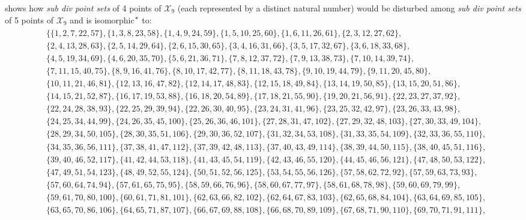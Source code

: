 \documentclass[11pt, oneside]{article}      %
\theoremstyle{definition}
\numberwithin{equation}{section}
\theoremstyle{c}
\begin{document}
shows how \textit{sub div point sets} of 4 points of $\mathscr{X_9}$ (each represented by a distinct natural number) would be disturbed among \textit{sub div point sets} of 5 points of $\mathscr{X_9}$ and is isomorphic$\color{black}^*$ to:
{\tiny
\begin{align*}\begin{split} 
&\{\{1,2,7,22,57\},\{1,3,8,23,58\},\{1,4,9,24,59\},\{1,5,10,25,60\},\{1,6,11,26,61\},\{2,3,12,27,62\},\\
&\{2,4,13,28,63\},\{2,5,14,29,64\},\{2,6,15,30,65\},\{3,4,16,31,66\},\{3,5,17,32,67\},\{3,6,18,33,68\},\\
&\{4,5,19,34,69\},\{4,6,20,35,70\},\{5,6,21,36,71\},\{7,8,12,37,72\},\{7,9,13,38,73\},\{7,10,14,39,74\},\\
&\{7,11,15,40,75\},\{8,9,16,41,76\},\{8,10,17,42,77\},\{8,11,18,43,78\},\{9,10,19,44,79\},\{9,11,20,45,80\},\\
&\{10,11,21,46,81\},\{12,13,16,47,82\},\{12,14,17,48,83\},\{12,15,18,49,84\},\{13,14,19,50,85\},\{13,15,20,51,86\},\\
&\{14,15,21,52,87\},\{16,17,19,53,88\},\{16,18,20,54,89\},\{17,18,21,55,90\},\{19,20,21,56,91\},\{22,23,27,37,92\},\\
&\{22,24,28,38,93\},\{22,25,29,39,94\},\{22,26,30,40,95\},\{23,24,31,41,96\},\{23,25,32,42,97\},\{23,26,33,43,98\},\\
&\{24,25,34,44,99\},\{24,26,35,45,100\},\{25,26,36,46,101\},\{27,28,31,47,102\},\{27,29,32,48,103\},\{27,30,33,49,104\},\\
&\{28,29,34,50,105\},\{28,30,35,51,106\},\{29,30,36,52,107\},\{31,32,34,53,108\},\{31,33,35,54,109\},\{32,33,36,55,110\},\\
&\{34,35,36,56,111\},\{37,38,41,47,112\},\{37,39,42,48,113\},\{37,40,43,49,114\},\{38,39,44,50,115\},\{38,40,45,51,116\},\\
&\{39,40,46,52,117\},\{41,42,44,53,118\},\{41,43,45,54,119\},\{42,43,46,55,120\},\{44,45,46,56,121\},\{47,48,50,53,122\},\\
&\{47,49,51,54,123\},\{48,49,52,55,124\},\{50,51,52,56,125\},\{53,54,55,56,126\},\{57,58,62,72,92\},\{57,59,63,73,93\},\\
&\{57,60,64,74,94\},\{57,61,65,75,95\},\{58,59,66,76,96\},\{58,60,67,77,97\},\{58,61,68,78,98\},\{59,60,69,79,99\},\\
&\{59,61,70,80,100\},\{60,61,71,81,101\},\{62,63,66,82,102\},\{62,64,67,83,103\},\{62,65,68,84,104\},\{63,64,69,85,105\},\\
&\{63,65,70,86,106\},\{64,65,71,87,107\},\{66,67,69,88,108\},\{66,68,70,89,109\},\{67,68,71,90,110\},\{69,70,71,91,111\},\\

\end{split}
\end{align*}}
\end{document}
